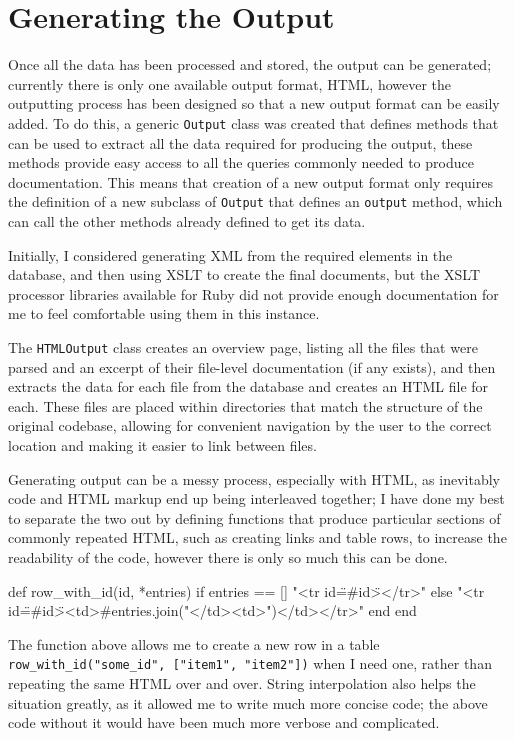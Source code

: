 \section{Generating the Output}

Once all the data has been processed and stored, the output can be generated;
currently there is only one available output format, HTML, however the
outputting process has been designed so that a new output format can be easily
added. To do this, a generic \lstinline|Output| class was created that defines
methods that can be used to extract all the data required for producing the
output, these methods provide easy access to all the queries commonly needed to
produce documentation. This means that creation of a new output format only
requires the definition of a new subclass of \lstinline|Output| that defines an
\lstinline|output| method, which can call the other methods already defined to
get its data.

Initially, I considered generating XML from the required elements in the
database, and then using XSLT to create the final documents, but the XSLT
processor libraries available for Ruby did not provide enough documentation for
me to feel comfortable using them in this instance.

The \lstinline|HTMLOutput| class creates an overview page, listing all the files
that were parsed and an excerpt of their file-level documentation (if any
exists), and then extracts the data for each file from the database and creates
an HTML file for each. These files are placed within directories that match the
structure of the original codebase, allowing for convenient navigation by the
user to the correct location and making it easier to link between files.

Generating output can be a messy process, especially with HTML, as inevitably
code and HTML markup end up being interleaved together; I have done my best to
separate the two out by defining functions that produce particular sections of
commonly repeated HTML, such as creating links and table rows, to increase the
readability of the code, however there is only so much this can be done.

\begin{code}[language=ruby, gobble=2]
  def row_with_id(id, *entries)
    if entries == []
      "<tr id=\"#{id}\"></tr>"
    else
      "<tr id=\"#{id}\"><td>#{entries.join("</td><td>")}</td></tr>\n"
    end
  end
\end{code}

The function above allows me to create a new row in a table
\lstinline|row_with_id("some_id", ["item1", "item2"])| when I need one, rather
than repeating the same HTML over and over. String interpolation also helps the
situation greatly, as it allowed me to write much more concise code; the above
code without it would have been much more verbose and complicated.

